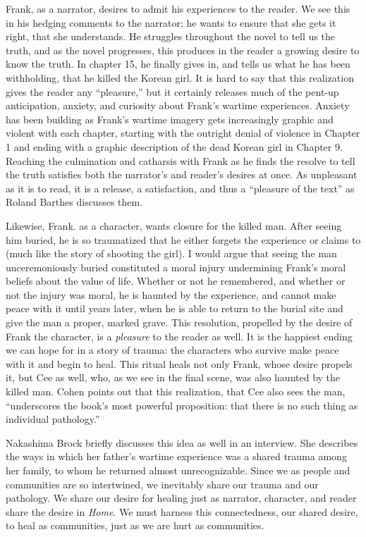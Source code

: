 \documentclass[12pt]{article}
\begin{document}
Frank, as a narrator, desires to admit his experiences to the reader. We see
this in his hedging comments to the narrator; he wants to ensure that she gets
it right, that she understands.\autocite[p.~6,~42,~70,~84]{Morrison12} He
struggles throughout the novel to tell us the truth, and as the novel
progresses, this produces in the reader a growing desire to know the truth. In
chapter 15,\autocite[p.~133]{Morrison12} he finally gives in, and tells us what
he has been withholding, that he killed the Korean girl. It is hard to say that
this realization gives the reader any ``pleasure,'' but it certainly releases
much of the pent-up anticipation, anxiety, and curiosity about Frank's wartime
experiences. Anxiety has been building as Frank's wartime imagery gets
increasingly graphic and violent with each chapter, starting with the outright
denial of violence in Chapter 1 and ending with a graphic description of the
dead Korean girl in Chapter 9.\autocite[Ch.~1,~3,~5,~7,~9]{Morrison12} Reaching
the culmination and catharsis with Frank as he finds the resolve to tell the
truth satisfies both the narrator's and reader's desires at once. As unpleasant
as it is to read, it is a release, a satisfaction, and thus a ``pleasure of the
text'' as Roland Barthes discusses them.\autocite[p.  124]{Charon06}

Likewise, Frank. as a character, wants closure for the killed man. After seeing
him buried, he is so traumatized that he either forgets the experience or
claims to (much like the story of shooting the girl).\autocite[p.
5-6]{Morrison12} I would argue that seeing the man unceremoniously buried
constituted a moral injury undermining Frank's moral beliefs about the value of
life. Whether or not he remembered, and whether or not the injury was moral, he
is haunted by the experience, and cannot make peace with it until years later,
when he is able to return to the burial site and give the man a proper, marked
grave. This resolution, propelled by the desire of Frank the character, is a
\emph{pleasure} to the reader as well. It is the happiest ending we can hope
for in a story of trauma: the characters who survive make peace with it and
begin to heal. This ritual heals not only Frank, whose desire propels it, but
Cee as well, who, as we see in the final scene, was also haunted by the killed
man. Cohen points out that this realization, that Cee also sees the man,
``underscores the book's most powerful proposition: that there is no such thing
as individual pathology.''\autocite{Cohen12}

Nakashima Brock briefly discusses this idea as well in an interview. She
describes the ways in which her father's wartime experience was a shared trauma
among her family, to whom he returned almost unrecognizable.\autocite{Brock15}
Since we as people and communities are so intertwined, we inevitably share our
trauma and our pathology. We share our desire for healing just as narrator,
character, and reader share the desire in \emph{Home}. We must harness this
connectedness, our shared desire, to heal as communities, just as we are hurt
as communities.
\end{document}
